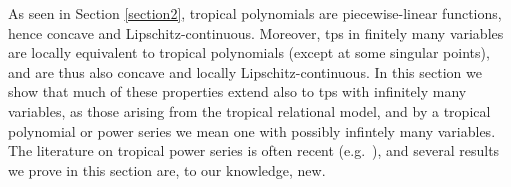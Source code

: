 

As seen in Section \ref{section2}, tropical polynomials are piecewise-linear functions, hence concave and Lipschitz-continuous. Moreover, tps in finitely many variables are locally equivalent to tropical polynomials (except at some singular points), and are thus also concave and locally Lipschitz-continuous.
In this section we show that much of these properties extend also to tps with infinitely many variables, as those arising from the tropical relational model, %
and by a tropical polynomial or power series we mean one with possibly infintely many variables.
The literature on tropical power series is often recent (e.g.~\cite{Porzio2021}), and several results we prove in this section are, to our knowledge, new.
%
%

